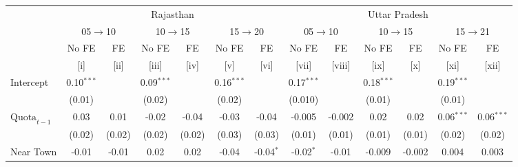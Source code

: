
\begingroup
\centering
\scriptsize
\begin{adjustbox}{max width=\linewidth}
   \begin{threeparttable}[b]
      \begin{tabular}{lcccccccccccc}
         \toprule
          & \multicolumn{6}{c}{Rajasthan} & \multicolumn{6}{c}{Uttar Pradesh} \\ 
          & \multicolumn{2}{c}{05$\rightarrow$10} & \multicolumn{2}{c}{10$\rightarrow$15} & \multicolumn{2}{c}{15$\rightarrow$20} & \multicolumn{2}{c}{05$\rightarrow$10} & \multicolumn{2}{c}{10$\rightarrow$15} & \multicolumn{2}{c}{15$\rightarrow$21} \\ 
                                                        & No FE        & FE            & No FE        & FE            & No FE        & FE            & No FE         & FE            & No FE         & FE            & No FE        & FE \\   
                                                        & [i]          & [ii]          & [iii]        & [iv]          & [v]          & [vi]          & [vii]         & [viii]        & [ix]          & [x]           & [xi]         & [xii]\\  
         \midrule 
         Intercept                                      & 0.10$^{***}$ &               & 0.09$^{***}$ &               & 0.16$^{***}$ &               & 0.17$^{***}$  &               & 0.18$^{***}$  &               & 0.19$^{***}$ &   \\   
                                                        & (0.01)       &               & (0.02)       &               & (0.02)       &               & (0.010)       &               & (0.01)        &               & (0.01)       &   \\   
         $\text{Quota}_{t-1}$                           & 0.03         & 0.01          & -0.02        & -0.04         & -0.03        & -0.04         & -0.005        & -0.002        & 0.02          & 0.02          & 0.06$^{***}$ & 0.06$^{***}$\\   
                                                        & (0.02)       & (0.02)        & (0.02)       & (0.02)        & (0.03)       & (0.03)        & (0.01)        & (0.01)        & (0.01)        & (0.01)        & (0.02)       & (0.02)\\   
         Near Town                                      & -0.01        & -0.01         & 0.02         & 0.02          & -0.04        & -0.04$^{*}$   & -0.02$^{*}$   & -0.01         & -0.009        & -0.002        & 0.004        & 0.003\\   

\end{tabular}
\end{threeparttable}
\end{adjustbox}
